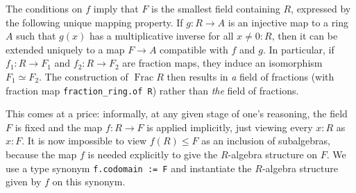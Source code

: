 \documentclass[a4paper,USenglish,cleveref, autoref, thm-restate]{lipics-v2021}
\newcommand{\lean}[1]{\texttt{#1}\xspace} %
\newcommand{\Q}{\mathbb{Q}}
\newcommand{\Z}{\mathbb{Z}}
\DeclareMathOperator{\Frac}{Frac}
\begin{document}
The conditions on $f$ imply that $F$ is the smallest field containing $R$, expressed by the following unique mapping property.
If $g \colon R \to A$ is an injective map to a ring $A$ such that $g(x)$ has a multiplicative inverse for all $x \ne 0 : R$, then
it can be extended uniquely to a map $F \to A$ compatible with $f$ and $g$.
In particular, if $f_1 \colon R \to F_1$ and $f_2 \colon R \to F_2$ are fraction maps, they induce an isomorphism $F_1 \simeq F_2$.
The construction of $\Frac R$ then results in \emph{a} field of fractions (with fraction map \lean{fraction\_ring.of R}) rather than \emph{the} field of fractions.


This comes at a price: %
informally, at any given stage of one's reasoning, the field $F$ is fixed and the map $f\colon R\to F$ is applied implicitly, just viewing every $x:R$ as $x:F$.
It is now impossible to view $f(R) \leq F$ as an inclusion of subalgebras,
because the map $f$ is needed explicitly to give the $R$-algebra structure on $F$.
We use a type synonym \lean{f.codomain := F} and instantiate the $R$-algebra structure given by $f$ on this synonym.

\end{document}
